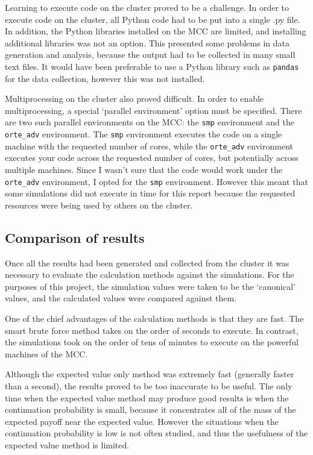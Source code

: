 \documentclass[a4paper,12pt]{article}
\begin{document}
Learning to execute code on the cluster proved to be a challenge.
In order to execute code on the cluster, all Python code had to be put into a single .py file.
In addition, the Python libraries installed on the MCC are limited, and installing additional libraries was not an option.
This presented some problems in data generation and analysis, because the output had to be collected in many small text files.
It would have been preferable to use a Python library such as \texttt{pandas} for the data collection, however this was not installed.

Multiprocessing on the cluster also proved difficult.
In order to enable multiprocessing, a special `parallel environment' option must be specified.
There are two such parallel environments on the MCC: the \texttt{smp} environment and the \texttt{orte\_adv} environment.
The \texttt{smp} environment executes the code on a single machine with the requested number of cores, while the \texttt{orte\_adv} environment executes your code across the requested number of cores, but potentially across multiple machines.
Since I wasn't sure that the code would work under the \texttt{orte\_adv} environment, I opted for the \texttt{smp} environment.
However this meant that some simulations did not execute in time for this report because the requested resources were being used by others on the cluster.

\subsection{Comparison of results}

Once all the results had been generated and collected from the cluster it was necessary to evaluate the calculation methods against the simulations.
For the purposes of this project, the simulation values were taken to be the `canonical' values, and the calculated values were compared against them.

One of the chief advantages of the calculation methods is that they are fast.
The smart brute force method takes on the order of seconds to execute.
In contrast, the simulations took on the order of tens of minutes to execute on the powerful machines of the MCC.

Although the expected value only method was extremely fast (generally faster than a second), the results proved to be too inaccurate to be useful.
The only time when the expected value method may produce good results is when the continuation probability is small, because it concentrates all of the mass of the expected payoff near the expected value.
However the situations when the continuation probability is low is not often studied, and thus the usefulness of the expected value method is limited.
\end{document}
